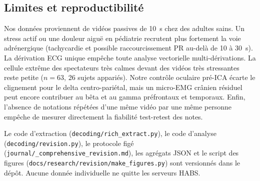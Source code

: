 \documentclass[10pt]{article}
\begin{document}
\subsection{Limites et reproductibilité}

Nos données proviennent de vidéos passives de 10~s chez des adultes sains. Un stress actif ou une douleur aiguë en pédiatrie recrutent plus fortement la voie adrénergique (tachycardie et possible raccourcissement PR au-delà de 10 à 30~s). La dérivation ECG unique empêche toute analyse vectorielle multi-dérivations. La cellule extrême des spectateurs très calmes devant des vidéos très stressantes reste petite ($n = 63$, 26 sujets appariés). Notre contrôle oculaire pré-ICA écarte le clignement pour le delta centro-pariétal, mais un micro-EMG crânien résiduel peut encore contribuer au bêta et au gamma préfrontaux et temporaux. Enfin, l'absence de notations répétées d'une même vidéo par une même personne empêche de mesurer directement la fiabilité test-retest des notes.

Le code d'extraction (\texttt{decoding/\allowbreak rich\_extract.py}), le code d'analyse (\texttt{decoding/\allowbreak revision.py}), le protocole figé (\texttt{journal/\_comprehensive\_revision.md}), les agrégats JSON et le script des figures (\texttt{docs/\allowbreak research/\allowbreak revision/\allowbreak make\_figures.py}) sont versionnés dans le dépôt. Aucune donnée individuelle ne quitte les serveurs HABS.
\end{document}
